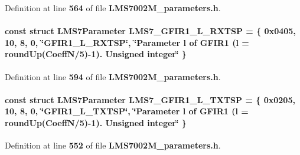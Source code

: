 Definition at line {\bf 564} of file {\bf L\+M\+S7002\+M\+\_\+parameters.\+h}.

\paragraph[{L\+M\+S7\+\_\+\+G\+F\+I\+R1\+\_\+\+L\+\_\+\+R\+X\+T\+SP}]{\setlength{\rightskip}{0pt plus 5cm}const struct {\bf L\+M\+S7\+Parameter} L\+M\+S7\+\_\+\+G\+F\+I\+R1\+\_\+\+L\+\_\+\+R\+X\+T\+SP = \{ 0x0405, 10, 8, 0, \char`\"{}\+G\+F\+I\+R1\+\_\+\+L\+\_\+\+R\+X\+T\+S\+P\char`\"{}, \char`\"{}\+Parameter l of G\+F\+I\+R1 (l = round\+Up(\+Coeff\+N/5)-\/1). Unsigned integer\char`\"{} \}\hspace{0.3cm}{\ttfamily [static]}}\label{LMS7002M__parameters_8h_a29b17df81ee4f9fbc6e1e64d8945aa24}


Definition at line {\bf 594} of file {\bf L\+M\+S7002\+M\+\_\+parameters.\+h}.

\paragraph[{L\+M\+S7\+\_\+\+G\+F\+I\+R1\+\_\+\+L\+\_\+\+T\+X\+T\+SP}]{\setlength{\rightskip}{0pt plus 5cm}const struct {\bf L\+M\+S7\+Parameter} L\+M\+S7\+\_\+\+G\+F\+I\+R1\+\_\+\+L\+\_\+\+T\+X\+T\+SP = \{ 0x0205, 10, 8, 0, \char`\"{}\+G\+F\+I\+R1\+\_\+\+L\+\_\+\+T\+X\+T\+S\+P\char`\"{}, \char`\"{}\+Parameter l of G\+F\+I\+R1 (l = round\+Up(\+Coeff\+N/5)-\/1). Unsigned integer\char`\"{} \}\hspace{0.3cm}{\ttfamily [static]}}\label{LMS7002M__parameters_8h_a224016381019cf3df184ce300dd9a8f6}


Definition at line {\bf 552} of file {\bf L\+M\+S7002\+M\+\_\+parameters.\+h}.

